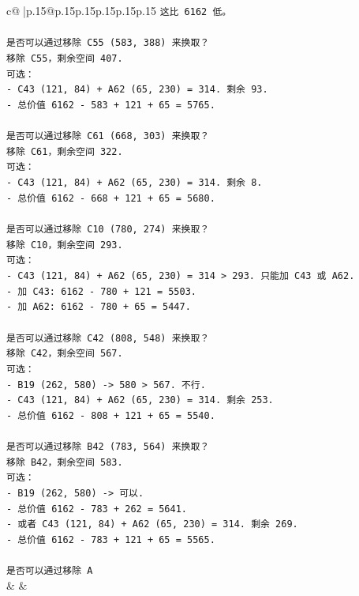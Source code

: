\documentclass{article}
\begin{document}
{\begin{supertabular}{c@{$\;$}|p{.15\linewidth}@{}p{.15\linewidth}p{.15\linewidth}p{.15\linewidth}p{.15\linewidth}p{.15\linewidth}}
{{{\texttt{这比 6162 低。} \\
\\ 
\texttt{是否可以通过移除 C55 (583, 388) 来换取？} \\
\texttt{移除 C55，剩余空间 407.} \\
\texttt{可选：} \\
\texttt{{-} C43 (121, 84) + A62 (65, 230) = 314. 剩余 93.} \\
\texttt{{-} 总价值 6162 {-} 583 + 121 + 65 = 5765.} \\
\\ 
\texttt{是否可以通过移除 C61 (668, 303) 来换取？} \\
\texttt{移除 C61，剩余空间 322.} \\
\texttt{可选：} \\
\texttt{{-} C43 (121, 84) + A62 (65, 230) = 314. 剩余 8.} \\
\texttt{{-} 总价值 6162 {-} 668 + 121 + 65 = 5680.} \\
\\ 
\texttt{是否可以通过移除 C10 (780, 274) 来换取？} \\
\texttt{移除 C10，剩余空间 293.} \\
\texttt{可选：} \\
\texttt{{-} C43 (121, 84) + A62 (65, 230) = 314 > 293. 只能加 C43 或 A62.} \\
\texttt{{-} 加 C43: 6162 {-} 780 + 121 = 5503.} \\
\texttt{{-} 加 A62: 6162 {-} 780 + 65 = 5447.} \\
\\ 
\texttt{是否可以通过移除 C42 (808, 548) 来换取？} \\
\texttt{移除 C42，剩余空间 567.} \\
\texttt{可选：} \\
\texttt{{-} B19 (262, 580) {-}> 580 > 567. 不行.} \\
\texttt{{-} C43 (121, 84) + A62 (65, 230) = 314. 剩余 253.} \\
\texttt{{-} 总价值 6162 {-} 808 + 121 + 65 = 5540.} \\
\\ 
\texttt{是否可以通过移除 B42 (783, 564) 来换取？} \\
\texttt{移除 B42，剩余空间 583.} \\
\texttt{可选：} \\
\texttt{{-} B19 (262, 580) {-}> 可以.} \\
\texttt{{-} 总价值 6162 {-} 783 + 262 = 5641.} \\
\texttt{{-} 或者 C43 (121, 84) + A62 (65, 230) = 314. 剩余 269.} \\
\texttt{{-} 总价值 6162 {-} 783 + 121 + 65 = 5565.} \\
\\ 
\texttt{是否可以通过移除 A} \\
            }
        }
    }
    & & \\ \\


\end{supertabular}}
\end{document}
